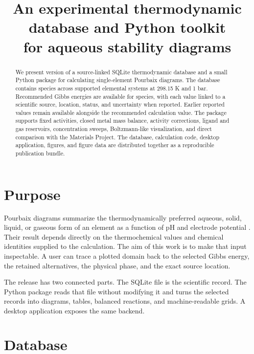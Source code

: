 \documentclass[10pt,twocolumn]{article}
\title{An experimental thermodynamic database and Python toolkit\\for aqueous stability diagrams}
\author{}
\date{}
\begin{document}
\maketitle
\vspace{-2.5em}

\begin{abstract}
We present version \DatasetVersion{} of a source-linked SQLite thermodynamic database and a small
Python package for calculating single-element Pourbaix diagrams. The database contains
\SpeciesCount{} species across \SystemCount{} supported elemental systems at 298.15 K and 1 bar.
Recommended Gibbs energies are available for \GibbsCount{} species, with each value linked to a
scientific source, location, status, and uncertainty when reported. Earlier reported values remain
available alongside the recommended calculation value. The package supports fixed activities,
closed metal mass balance, activity corrections, ligand and gas reservoirs, concentration sweeps,
Boltzmann-like visualization, and direct comparison with the Materials Project. The database,
calculation code, desktop application, figures, and figure data are distributed together
as a reproducible publication bundle.
\end{abstract}

\section{Purpose}

Pourbaix diagrams summarize the thermodynamically preferred aqueous, solid, liquid, or gaseous
form of an element as a function of pH and electrode potential \cite{method-pourbaix}. Their result
depends directly on the thermochemical values and chemical identities supplied to the calculation.
The aim of this work is to make that input inspectable. A user can trace a plotted domain back to
the selected Gibbs energy, the retained alternatives, the physical phase, and the exact source
location.

The release has two connected parts. The SQLite file is the scientific record. The Python package
reads that file without modifying it and turns the selected records into diagrams, tables, balanced
reactions, and machine-readable grids. A desktop application exposes the same backend.

\section{Database}
\end{document}
